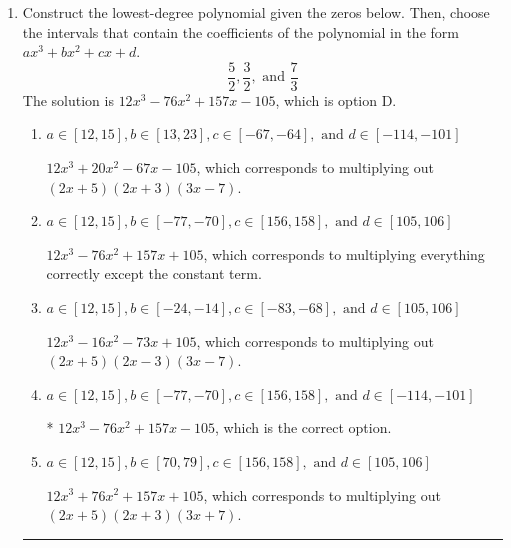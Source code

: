 \documentclass{extbook}[14pt]
\newcommand{\litem}[1]{\item #1

\rule{\textwidth}{0.4pt}}
\begin{document}
\begin{enumerate}\litem{
Construct the lowest-degree polynomial given the zeros below. Then, choose the intervals that contain the coefficients of the polynomial in the form $ax^3+bx^2+cx+d$.
\[ \frac{5}{2}, \frac{3}{2}, \text{ and } \frac{7}{3} \]The solution is \( 12x^{3} -76 x^{2} +157 x -105 \), which is option D.\begin{enumerate}[label=\Alph*.]
\item \( a \in [12, 15], b \in [13, 23], c \in [-67, -64], \text{ and } d \in [-114, -101] \)

$12x^{3} +20 x^{2} -67 x -105$, which corresponds to multiplying out $(2x + 5)(2x + 3)(3x -7)$.
\item \( a \in [12, 15], b \in [-77, -70], c \in [156, 158], \text{ and } d \in [105, 106] \)

$12x^{3} -76 x^{2} +157 x + 105$, which corresponds to multiplying everything correctly except the constant term.
\item \( a \in [12, 15], b \in [-24, -14], c \in [-83, -68], \text{ and } d \in [105, 106] \)

$12x^{3} -16 x^{2} -73 x + 105$, which corresponds to multiplying out $(2x + 5)(2x -3)(3x -7)$.
\item \( a \in [12, 15], b \in [-77, -70], c \in [156, 158], \text{ and } d \in [-114, -101] \)

* $12x^{3} -76 x^{2} +157 x -105$, which is the correct option.
\item \( a \in [12, 15], b \in [70, 79], c \in [156, 158], \text{ and } d \in [105, 106] \)

$12x^{3} +76 x^{2} +157 x + 105$, which corresponds to multiplying out $(2x + 5)(2x + 3)(3x + 7)$.
\end{enumerate}

}
\end{enumerate}
\end{document}
